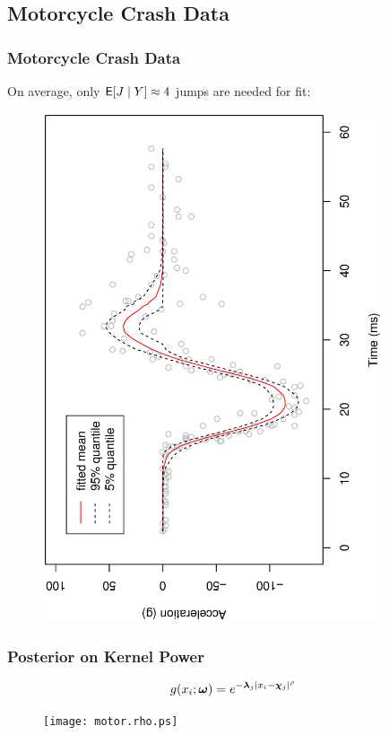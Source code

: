 \documentclass[dvips]{beamer}
\newcommand{\bs}[2]{\begin{frame} \frametitle{#1} 
{#2}
\end{frame} }
\begin{document}
\subsection{Motorcycle Crash Data}
\bs{Motorcycle Crash Data} {
\par
On average, only ${\sf{E}}[J\mid Y]\approx 4$ jumps are needed for fit:\par
\begin{figure}[!h]
  \begin{center}
    \includegraphics[angle=270,origin=l, clip=1,
     totalheight=6truecm,width=10cm]{motorfitted.ps}
  \end{center}
\end{figure}
}

\bs{Posterior on Kernel Power}{
\[g(x_i; \bm \omega) = e^{-\bm \lambda_j |x_i - \bm \chi_j|^\rho}\]

\begin{figure}[!h]
  \begin{center}
    \texttt{[image: motor.rho.ps]}
  \end{center}
\end{figure}
}
\end{document}

